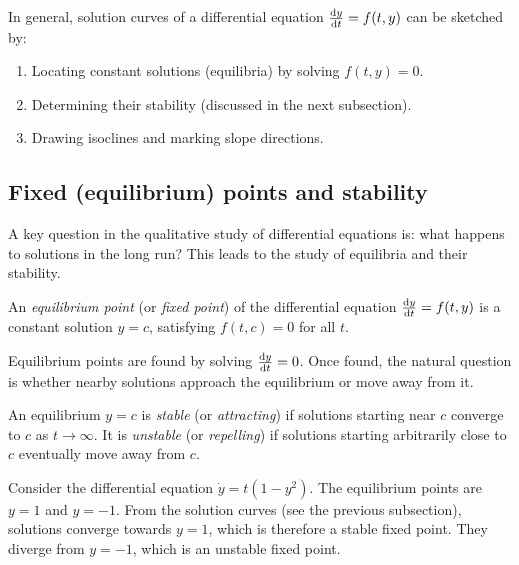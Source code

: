 \documentclass[a4paper]{article}
\begin{document}
\begin{remark}
  In general, solution curves of a differential equation $\frac{\mathrm{d} y}{\mathrm{d} t} = f(t, y)$ can be sketched by:
  \begin{enumerate}
    \item Locating constant solutions (equilibria) by solving $f(t, y) = 0$.
    \item Determining their stability (discussed in the next subsection).
    \item Drawing isoclines and marking slope directions.
  \end{enumerate}
\end{remark}

\subsection{Fixed (equilibrium) points and stability}
\begin{remark}[Motivation]
  A key question in the qualitative study of differential equations is: what happens to solutions in the long run? This leads to the study of equilibria and their stability.
\end{remark}

\begin{defi}
  An \emph{equilibrium point} (or \emph{fixed point}) of the differential equation $\frac{\mathrm{d} y}{\mathrm{d} t} = f(t, y)$ is a constant solution $y = c$, satisfying $f(t, c) = 0$ for all $t$.
\end{defi}

\begin{remark}
  Equilibrium points are found by solving $\frac{\mathrm{d} y}{\mathrm{d} t} = 0$. Once found, the natural question is whether nearby solutions approach the equilibrium or move away from it.
\end{remark}

\begin{defi}[Stability]
  An equilibrium $y = c$ is \emph{stable} (or \emph{attracting}) if solutions starting near $c$ converge to $c$ as $t \to \infty$. It is \emph{unstable} (or \emph{repelling}) if solutions starting arbitrarily close to $c$ eventually move away from $c$.
\end{defi}
\begin{eg}[Stability of equilibria for $\dot{y} = t(1 - y^2)$]
  Consider the differential equation $\dot{y} = t(1 - y^2)$. The equilibrium points are $y = 1$ and $y = -1$. From the solution curves (see the previous subsection), solutions converge towards $y = 1$, which is therefore a stable fixed point. They diverge from $y = -1$, which is an unstable fixed point.
\end{eg}
\end{document}
